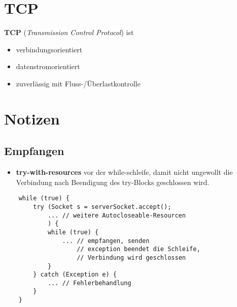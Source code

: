 \section{TCP}

\textbf{TCP} (\textit{Transmission Control Protocol}) ist

\begin{itemize}
    \item verbindungsorientiert
    \item datenstromorientiert
    \item zuverlässig mit Fluss-/Überlastkontrolle
\end{itemize}


\section*{Notizen}

\subsection*{Empfangen}
\begin{itemize}
    \item \textbf{try-with-resources} vor der while-schleife, damit nicht ungewollt die Verbindung nach Beendigung des try-Blocks geschlossen wird.
\end{itemize}


\begin{verbatim}
    while (true) {
        try (Socket s = serverSocket.accept();
            ... // weitere Autocloseable-Resourcen
            ) {
            while (true) {
                ... // empfangen, senden
                    // exception beendet die Schleife,
                    // Verbindung wird geschlossen
            }
        } catch (Exception e) {
            ... // Fehlerbehandlung
        }
    }
\end{verbatim}
